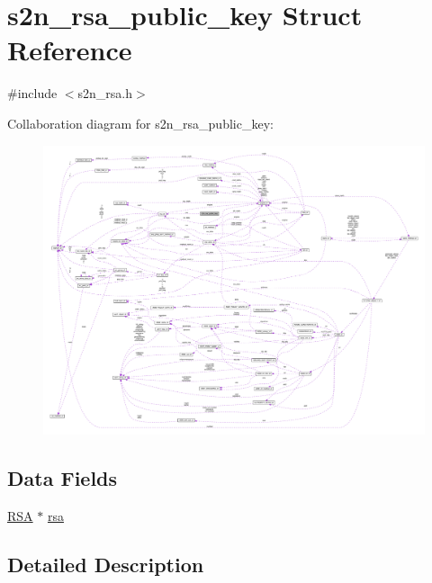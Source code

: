 \hypertarget{structs2n__rsa__public__key}{}\section{s2n\+\_\+rsa\+\_\+public\+\_\+key Struct Reference}
\label{structs2n__rsa__public__key}


{\ttfamily \#include $<$s2n\+\_\+rsa.\+h$>$}



Collaboration diagram for s2n\+\_\+rsa\+\_\+public\+\_\+key\+:\nopagebreak
\begin{figure}[H]
\begin{center}
\leavevmode
\includegraphics[width=350pt]{structs2n__rsa__public__key__coll__graph}
\end{center}
\end{figure}
\subsection*{Data Fields}
\begin{DoxyCompactItemize}
\item 
\hyperlink{crypto_2ossl__typ_8h_a9ad4496a11f0a9f686bea793cb97f8b5}{R\+SA} $\ast$ \hyperlink{structs2n__rsa__public__key_abe5e4dd8049eff80d7e599d751f143f8}{rsa}
\end{DoxyCompactItemize}


\subsection{Detailed Description}


